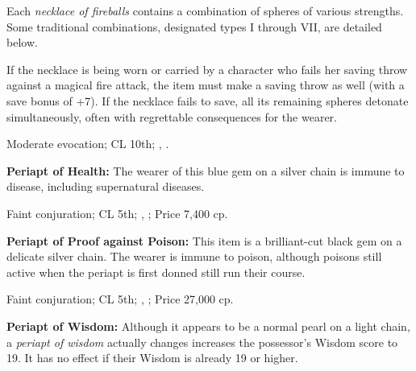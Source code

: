 Each \emph{necklace of fireballs} contains a combination of spheres of various strengths. Some traditional combinations, designated types I through VII, are detailed below.


If the necklace is being worn or carried by a character who fails her saving throw against a magical fire attack, the item must make a saving throw as well (with a save bonus of +7). If the necklace fails to save, all its remaining spheres detonate simultaneously, often with regrettable consequences for the wearer.

Moderate evocation; CL 10th; , .

\textbf{Periapt of Health:} The wearer of this blue gem on a silver chain is immune to disease, including supernatural diseases.

Faint conjuration; CL 5th; , ; Price 7,400 cp.

\textbf{Periapt of Proof against Poison:} This item is a brilliant-cut black gem on a delicate silver chain. The wearer is immune to poison, although poisons still active when the periapt is first donned still run their course.

Faint conjuration; CL 5th; , ; Price 27,000 cp.

\textbf{Periapt of Wisdom:} Although it appears to be a normal pearl on a light chain, a \emph{periapt of wisdom} actually changes increases the possessor's Wisdom score to 19. It has no effect if their Wisdom is already 19 or higher.

